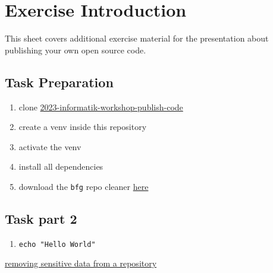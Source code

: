 \documentclass[paper=a4]{scrartcl}
\newcommand{\theexercisenumber}{1} %
\newcommand{\thedate}{September 27, 2023} %
\begin{document}
\date{\thedate}
\exercise{\theexercisenumber}

\parskip 8pt
\makesheetheader

\section*{Exercise Introduction}
This sheet covers additional exercise material for the presentation about publishing your own open source code.

\tableofcontents

\bigskip


	\subsection*{Task Preparation}
		\begin{enumerate}
			\item clone \href{https://github.com/marc-philipp-knechtle/2023-informatik-workshop-publish-code}{2023-informatik-workshop-publish-code}
			\item create a venv inside this repository
			\item activate the venv
			\item install all dependencies
			\item download the \texttt{bfg} repo cleaner \href{https://rtyley.github.io/bfg-repo-cleaner/}{here}
		\end{enumerate}

	\subsection*{Task part 2}
	\begin{enumerate}
		\item \texttt{echo "Hello World"}
	\end{enumerate}

	\begin{hints} %
  		\item 
	\end{hints}


	\begin{literature} %
  		\item \href{https://docs.github.com/en/authentication/keeping-your-account-and-data-secure/removing-sensitive-data-from-a-repository}{removing sensitive data from a repository}
	\end{literature}
\end{document}
